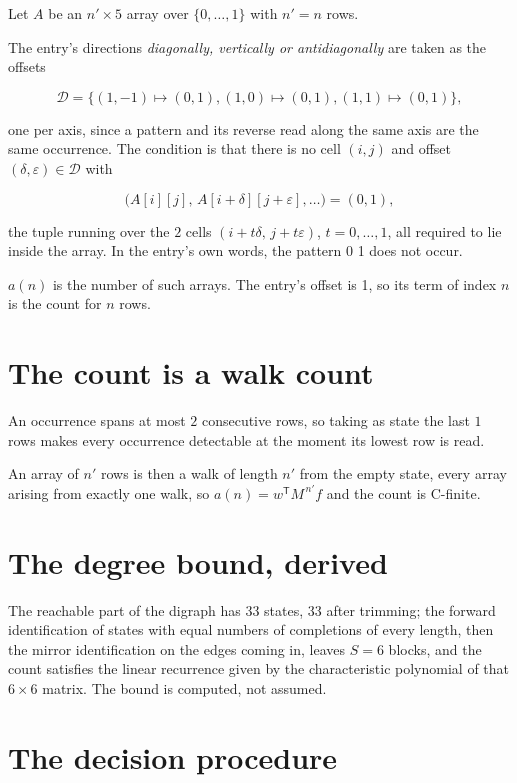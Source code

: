 \documentclass[11pt]{article}
\theoremstyle{definition}
\begin{document}
Let $A$ be an $n' \times 5$ array over $\{0,\dots,1\}$ with $n' = n$ rows.

The entry's directions {\itshape diagonally, vertically or antidiagonally} are taken as the offsets

\[\mathcal{D} = \{(1,-1)\mapsto(0,1), (1,0)\mapsto(0,1), (1,1)\mapsto(0,1)\},\]

one per axis, since a pattern and its reverse read along the same axis are the same occurrence. The condition is that there is no cell $(i,j)$ and offset $(\delta,\varepsilon)\in\mathcal{D}$ with

\[\bigl(A[i][j],\,A[i{+}\delta][j{+}\varepsilon],\dots\bigr) = (0, 1),\]

the tuple running over the $2$ cells $(i+t\delta,\,j+t\varepsilon)$, $t = 0,\dots,1$, all required to lie inside the array. In the entry's own words, the pattern 0 1 does not occur.

$a(n)$ is the number of such arrays. The entry's offset is 1, so its term of index $n$ is the count for $n$ rows.

\section{The count is a walk count}

An occurrence spans at most $2$ consecutive rows, so taking as state the last $1$ rows makes every occurrence detectable at the moment its lowest row is read.

An array of $n'$ rows is then a walk of length $n'$ from the empty state, every array arising from exactly one walk, so $a(n) = w^{\mathsf T}M^{\,n'}f$ and the count is C-finite.

\section{The degree bound, derived}

The reachable part of the digraph has $33$ states, $33$ after trimming; the forward identification of states with equal numbers of completions of every length, then the mirror identification on the edges coming in, leaves $S = 6$ blocks, and the count satisfies the linear recurrence given by the characteristic polynomial of that $6\times6$ matrix. The bound is computed, not assumed.

\section{The decision procedure}
\end{document}
